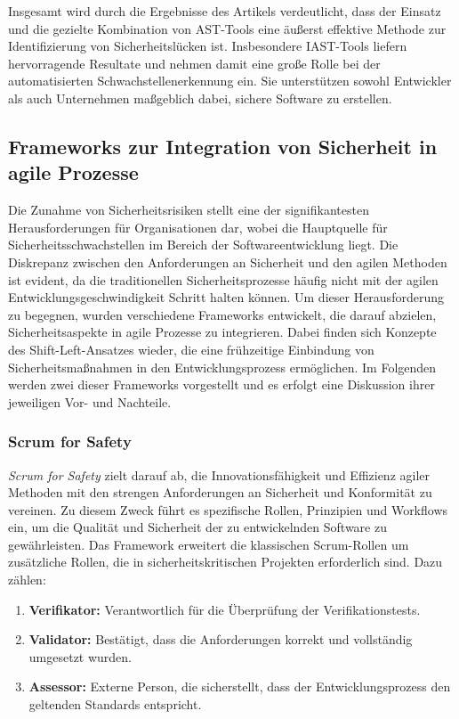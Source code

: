 \documentclass[acmtog]{acmart}
\begin{document}
Insgesamt wird durch die Ergebnisse des Artikels verdeutlicht, dass der Einsatz und die gezielte Kombination von AST-Tools eine äußerst effektive Methode zur Identifizierung von Sicherheitslücken ist.
Insbesondere IAST-Tools liefern hervorragende Resultate und nehmen damit eine große Rolle bei der automatisierten Schwachstellenerkennung ein.
Sie unterstützen sowohl Entwickler als auch Unternehmen maßgeblich dabei, sichere Software zu erstellen. 
\cite{mateo_tudela_combining_2020}

\subsection{Frameworks zur Integration von Sicherheit in agile Prozesse}

Die Zunahme von Sicherheitsrisiken stellt eine der signifikantesten Herausforderungen für Organisationen dar, 
wobei die Hauptquelle für Sicherheitsschwachstellen im Bereich der Softwareentwicklung liegt. 
Die Diskrepanz zwischen den Anforderungen an Sicherheit und den agilen Methoden ist evident, 
da die traditionellen Sicherheitsprozesse häufig nicht mit der agilen Entwicklungsgeschwindigkeit Schritt halten können. \cite{nagele_current_2023} 
Um dieser Herausforderung zu begegnen, wurden verschiedene Frameworks entwickelt, die darauf abzielen, Sicherheitsaspekte in agile Prozesse zu integrieren. Dabei finden sich Konzepte
des Shift-Left-Ansatzes wieder, die eine frühzeitige Einbindung von Sicherheitsmaßnahmen in den Entwicklungsprozess ermöglichen.
Im Folgenden werden zwei dieser Frameworks vorgestellt und es erfolgt eine Diskussion ihrer jeweiligen Vor- und Nachteile. 

\subsubsection{Scrum for Safety}

\textit{Scrum for Safety} zielt darauf ab, die Innovationsfähigkeit und Effizienz agiler Methoden mit den strengen Anforderungen an Sicherheit und Konformität zu vereinen. 
Zu diesem Zweck führt es spezifische Rollen, Prinzipien und Workflows ein, um die Qualität und Sicherheit der zu entwickelnden Software zu gewährleisten. 
Das Framework erweitert die klassischen Scrum-Rollen um zusätzliche Rollen, die in sicherheitskritischen Projekten erforderlich sind. \cite{barbareschi_scrum_2022} Dazu zählen: 

\begin{enumerate}
  \item \textbf{Verifikator:} Verantwortlich für die Überprüfung der Verifikationstests.
  \item \textbf{Validator:} Bestätigt, dass die Anforderungen korrekt und vollständig umgesetzt wurden.
  \item \textbf{Assessor:} Externe Person, die sicherstellt, dass der Entwicklungsprozess den geltenden Standards entspricht.
\end{enumerate}
\end{document}
